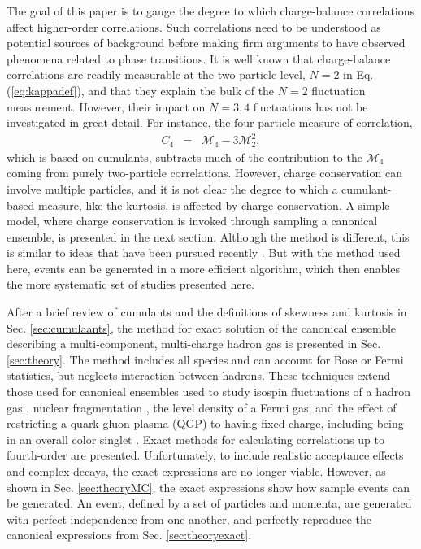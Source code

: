 \documentclass[aps,prc,nofootinbib,showpacs,superscriptaddress,groupedaddress]{revtex4-1}
\begin{document}
The goal of this paper is to gauge the degree to which charge-balance correlations affect higher-order correlations. Such correlations need to be understood as potential sources of background before making firm arguments to have observed phenomena related to phase transitions. It is well known that charge-balance correlations are readily measurable at the two particle level, $N=2$ in Eq. (\ref{eq:kappadef}), and that they explain the bulk of the $N=2$ fluctuation measurement. However, their impact on $N=3,4$ fluctuations has not be investigated in great detail. For instance, the four-particle measure of correlation,
\begin{eqnarray}
C_4&=&\mathcal{M}_4-3\mathcal{M}_2^2,
\end{eqnarray}
which is based on cumulants, subtracts much of the contribution to the $\mathcal{M}_4$ coming from purely two-particle correlations. However, charge conservation can involve multiple particles, and it is not clear the degree to which a cumulant-based measure, like the kurtosis, is affected by charge conservation. A simple model, where charge conservation is invoked through sampling a canonical ensemble, is presented in the next section. Although the method is different, this is similar to ideas that have been pursued recently \cite{Oliinychenko:2020cmr}. But with the method used here, events can be generated in a more efficient algorithm, which then enables the more systematic set of studies presented here.

After a brief review of cumulants and the definitions of skewness and kurtosis in Sec. \ref{sec:cumulaants}, the method for exact solution of the canonical ensemble describing a multi-component, multi-charge hadron gas is presented in Sec. \ref{sec:theory}. The method includes all species and can account for Bose or Fermi statistics, but neglects interaction between hadrons. These techniques extend those used for canonical ensembles used to study isospin fluctuations of a hadron gas \cite{}, nuclear fragmentation \cite{}, the level density of a Fermi gas, and the effect of restricting a quark-gluon plasma (QGP) to having fixed charge, including being in an overall color singlet \cite{}. Exact methods for calculating correlations up to fourth-order are presented. Unfortunately, to include realistic acceptance effects and complex decays, the exact expressions are no longer viable. However, as shown in Sec. \ref{sec:theoryMC}, the exact expressions show how sample events can be generated. An event, defined by a set of particles and momenta, are generated with perfect independence from one another, and perfectly reproduce the canonical expressions from Sec. \ref{sec:theoryexact}. 
\end{document}
